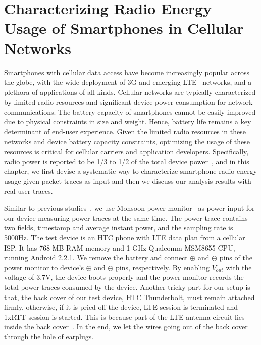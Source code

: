 \chapter{Characterizing Radio Energy Usage of Smartphones in Cellular Networks} 
\label{chap:power}

Smartphones with cellular data access have become increasingly popular across the globe, with the wide deployment of 3G and emerging LTE~\cite{3gpp.lte} networks, and a plethora of applications of all kinds. Cellular networks are typically characterized by limited radio resources and significant device power consumption for network communications. The battery capacity of smartphones cannot be easily improved due to physical constraints in size and weight. Hence, battery life remains a key determinant of end-user experience. Given the limited radio resources in these networks and device battery capacity constraints, optimizing the usage of these resources is critical for cellular carriers and application developers. Specifically, radio power is reported to be 1/3 to 1/2 of the total device power~\cite{mobisys.aro}, and in this chapter, we first devise a systematic way to characterize smartphone radio energy usage given packet traces as input and then we discuss our analysis results with real user traces.

\label{sec:power.method}

Similar to previous studies~\cite{imc.3g, codes.powertutor}, we use Monsoon power monitor~\cite{monsoon} as power input for our device measuring power traces at the same time. The power trace contains two fields, timestamp and average instant power, and the sampling rate is 5000Hz. The test device is an HTC phone with LTE data plan from a cellular ISP. It has 768 MB RAM memory and 1 GHz Qualcomm MSM8655 CPU, running Android 2.2.1. We remove the battery and connect $\oplus$ and $\ominus$ pins of the power monitor to device's $\oplus$ and $\ominus$ pins, respectively. By enabling $V_{out}$ with the voltage of 3.7V, the device boots properly and the power monitor records the total power traces consumed by the device. Another tricky part for our setup is that, the back cover of our test device, HTC Thunderbolt, must remain attached firmly, otherwise, if it is pried off the device, LTE session is terminated and 1xRTT session is started. This is because part of the LTE antenna circuit lies inside the back cover~\cite{thunderbolt}. In the end, we let the wires going out of the back cover through the hole of earplugs.

